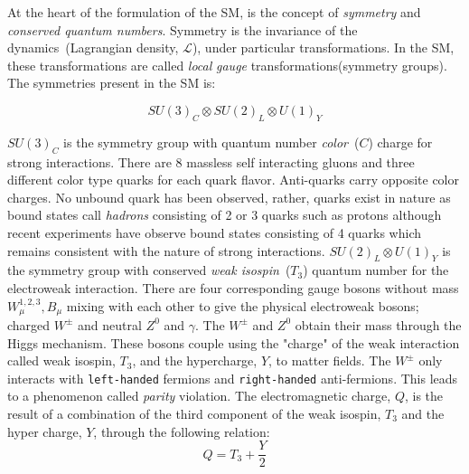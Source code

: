  At the heart of the formulation of the SM, is the concept of \textit{symmetry} and \textit{conserved quantum numbers}. Symmetry is the invariance of the dynamics~(Lagrangian density, $\mathcal{L}$), under particular transformations. In the SM, these transformations are called \textit{local} \textit{gauge} transformations(symmetry groups). %
The symmetries present in the SM is:

\begin{equation}
SU(3)_{C} \otimes SU(2)_{L} \otimes U(1)_{Y}
\end{equation}

$SU(3)_{C}$ is the symmetry group with quantum number \textit{color}~($C$) charge for strong interactions. There are 8 massless self interacting gluons and three different color type quarks for each quark flavor.  Anti-quarks carry opposite color charges. No unbound quark has been observed, rather, quarks exist in nature as bound states call \textit{hadrons} consisting of 2 or 3 quarks such as protons although recent experiments have observe bound states consisting of 4 quarks which remains consistent with the nature of strong interactions.
\newline
 $SU(2)_{L} \otimes U(1)_{Y}$ is the symmetry group with conserved \textit{weak isospin}~($T_{3}$)  quantum number for the electroweak interaction. There are four corresponding gauge bosons without mass $W^{1,2,3}_{\mu}, B_{\mu} $  mixing with each other to give the physical electroweak bosons; charged $W^{\pm}$ and neutral $Z^{0}$ and $\gamma$. The $W^{\pm}$ and $Z^{0}$ obtain their mass through the Higgs mechanism. These bosons couple using the "charge" of the weak interaction called weak isospin, $T_{3}$, and the hypercharge, $Y$, to matter fields. The $W^{\pm}$ only interacts with \texttt{left-handed} fermions and \texttt{right-handed} anti-fermions. This leads to a phenomenon called \textit{parity} violation. The electromagnetic charge, $Q$, is the result of a combination of the third component of the weak isospin, $T_{3}$ and the hyper charge, $Y$, through the following relation:
\begin{equation}
Q = T_{3} + \frac{Y}{2}
\end{equation}

